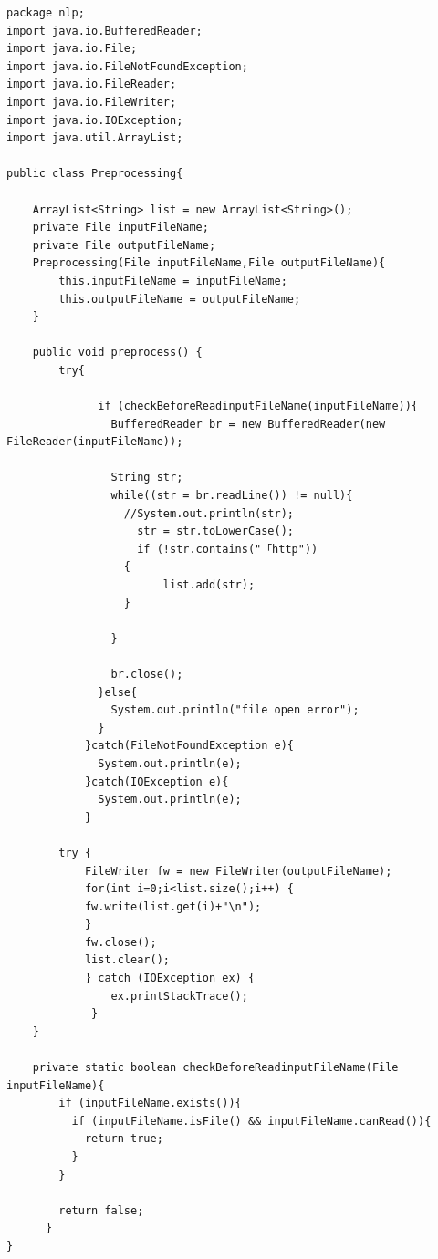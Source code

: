 \documentclass[a4j]{jarticle}
\begin{document}
\begin{lstlisting}[basicstyle=\ttfamily\footnotesize, frame=single,label=PreprocessingClass,caption=Preprocessingクラスのソースコード]
package nlp;
import java.io.BufferedReader;
import java.io.File;
import java.io.FileNotFoundException;
import java.io.FileReader;
import java.io.FileWriter;
import java.io.IOException;
import java.util.ArrayList;

public class Preprocessing{

	ArrayList<String> list = new ArrayList<String>();
	private File inputFileName;
	private File outputFileName;
	Preprocessing(File inputFileName,File outputFileName){
		this.inputFileName = inputFileName;
		this.outputFileName = outputFileName;
	}

    public void preprocess() {
    	try{

    	      if (checkBeforeReadinputFileName(inputFileName)){
    	        BufferedReader br = new BufferedReader(new FileReader(inputFileName));

    	        String str;
    	        while((str = br.readLine()) != null){
    	          //System.out.println(str);
    	        	str = str.toLowerCase();
    	        	if (!str.contains("「http"))
      	          {
    	        		list.add(str);
      	          }

    	        }

    	        br.close();
    	      }else{
    	        System.out.println("file open error");
    	      }
    	    }catch(FileNotFoundException e){
    	      System.out.println(e);
    	    }catch(IOException e){
    	      System.out.println(e);
    	    }

    	try {
			FileWriter fw = new FileWriter(outputFileName);
			for(int i=0;i<list.size();i++) {
			fw.write(list.get(i)+"\n");
			}
			fw.close();
			list.clear();
			} catch (IOException ex) {
				ex.printStackTrace();
			 }
    }

    private static boolean checkBeforeReadinputFileName(File inputFileName){
        if (inputFileName.exists()){
          if (inputFileName.isFile() && inputFileName.canRead()){
            return true;
          }
        }

        return false;
      }
}
\end{lstlisting}
\end{document}
